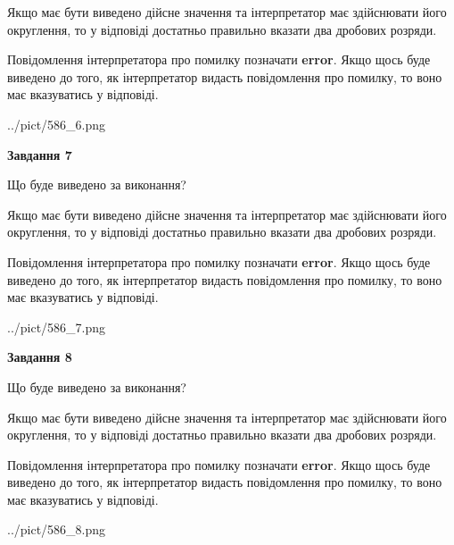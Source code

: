 \documentclass[12pt, ukrainian]{article}
\begin{document}
{\begin {Large}
Якщо має бути виведено дійсне значення та інтерпретатор має здійснювати його округлення, 
то у відповіді достатньо правильно вказати два дробових розряди.

Повідомлення інтерпретатора про помилку позначати \textbf{error}.
Якщо щось буде виведено до того, як інтерпретатор видасть повідомлення про помилку, 
то воно має вказуватись у відповіді. \par

\begin{center}
	{../pict/586_6.png}
\end{center}
\newpage

{\begin {center}\textbf{Завдання 7}\end {center}}\par
Що буде виведено за виконання? \par

Якщо має бути виведено дійсне значення та інтерпретатор має здійснювати його округлення, 
то у відповіді достатньо правильно вказати два дробових розряди.

Повідомлення інтерпретатора про помилку позначати \textbf{error}.
Якщо щось буде виведено до того, як інтерпретатор видасть повідомлення про помилку, 
то воно має вказуватись у відповіді. \par

\begin{center}
	{../pict/586_7.png}
\end{center}
\newpage

{\begin {center}\textbf{Завдання 8}\end {center}}\par
Що буде виведено за виконання? \par

Якщо має бути виведено дійсне значення та інтерпретатор має здійснювати його округлення, 
то у відповіді достатньо правильно вказати два дробових розряди.

Повідомлення інтерпретатора про помилку позначати \textbf{error}.
Якщо щось буде виведено до того, як інтерпретатор видасть повідомлення про помилку, 
то воно має вказуватись у відповіді. \par

\begin{center}
	{../pict/586_8.png}
\end{center}
\newpage


\end{Large}}
\end{document}
